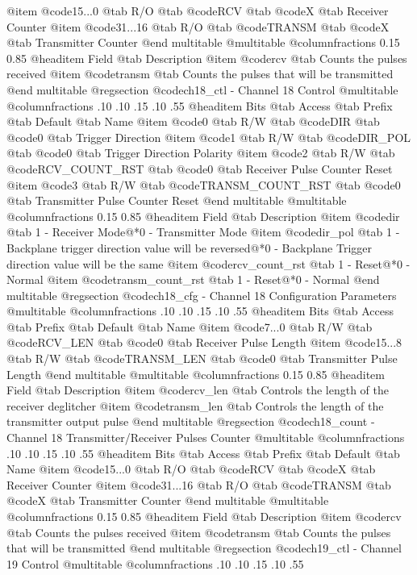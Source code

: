 @item @code{15...0}
@tab R/O @tab
@code{RCV}
@tab @code{X} @tab 
Receiver Counter
@item @code{31...16}
@tab R/O @tab
@code{TRANSM}
@tab @code{X} @tab 
Transmitter Counter
@end multitable
@multitable @columnfractions 0.15 0.85
@headitem Field @tab Description
@item @code{rcv} @tab Counts the pulses received
@item @code{transm} @tab Counts the pulses that will be transmitted
@end multitable
@regsection @code{ch18_ctl} - Channel 18 Control
@multitable @columnfractions .10 .10 .15 .10 .55
@headitem Bits @tab Access @tab Prefix @tab Default @tab Name
@item @code{0}
@tab R/W @tab
@code{DIR}
@tab @code{0} @tab 
Trigger Direction
@item @code{1}
@tab R/W @tab
@code{DIR_POL}
@tab @code{0} @tab 
Trigger Direction Polarity
@item @code{2}
@tab R/W @tab
@code{RCV_COUNT_RST}
@tab @code{0} @tab 
Receiver Pulse Counter Reset
@item @code{3}
@tab R/W @tab
@code{TRANSM_COUNT_RST}
@tab @code{0} @tab 
Transmitter Pulse Counter Reset
@end multitable
@multitable @columnfractions 0.15 0.85
@headitem Field @tab Description
@item @code{dir} @tab 1 - Receiver Mode@*0 - Transmitter Mode
@item @code{dir_pol} @tab 1 - Backplane trigger direction value will be reversed@*0 - Backplane Trigger direction value will be the same
@item @code{rcv_count_rst} @tab 1 - Reset@*0 - Normal
@item @code{transm_count_rst} @tab 1 - Reset@*0 - Normal
@end multitable
@regsection @code{ch18_cfg} - Channel 18 Configuration Parameters
@multitable @columnfractions .10 .10 .15 .10 .55
@headitem Bits @tab Access @tab Prefix @tab Default @tab Name
@item @code{7...0}
@tab R/W @tab
@code{RCV_LEN}
@tab @code{0} @tab 
Receiver Pulse Length
@item @code{15...8}
@tab R/W @tab
@code{TRANSM_LEN}
@tab @code{0} @tab 
Transmitter Pulse Length
@end multitable
@multitable @columnfractions 0.15 0.85
@headitem Field @tab Description
@item @code{rcv_len} @tab Controls the length of the receiver deglitcher
@item @code{transm_len} @tab Controls the length of the transmitter output pulse
@end multitable
@regsection @code{ch18_count} - Channel 18 Transmitter/Receiver Pulses Counter
@multitable @columnfractions .10 .10 .15 .10 .55
@headitem Bits @tab Access @tab Prefix @tab Default @tab Name
@item @code{15...0}
@tab R/O @tab
@code{RCV}
@tab @code{X} @tab 
Receiver Counter
@item @code{31...16}
@tab R/O @tab
@code{TRANSM}
@tab @code{X} @tab 
Transmitter Counter
@end multitable
@multitable @columnfractions 0.15 0.85
@headitem Field @tab Description
@item @code{rcv} @tab Counts the pulses received
@item @code{transm} @tab Counts the pulses that will be transmitted
@end multitable
@regsection @code{ch19_ctl} - Channel 19 Control
@multitable @columnfractions .10 .10 .15 .10 .55
